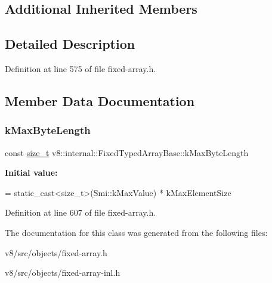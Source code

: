 \subsection*{Additional Inherited Members}


\subsection{Detailed Description}


Definition at line 575 of file fixed-\/array.\+h.



\subsection{Member Data Documentation}
\mbox{\label{classv8_1_1internal_1_1FixedTypedArrayBase_a911df330ee71dfde8f9affa302c710d0}} 
\subsubsection{\texorpdfstring{k\+Max\+Byte\+Length}{kMaxByteLength}}
{\footnotesize\ttfamily const \mbox{\hyperlink{classsize__t}{size\+\_\+t}} v8\+::internal\+::\+Fixed\+Typed\+Array\+Base\+::k\+Max\+Byte\+Length\hspace{0.3cm}{\ttfamily [static]}}

{\bfseries Initial value\+:}
\begin{DoxyCode}
=
      \textcolor{keyword}{static\_cast<}\textcolor{keywordtype}{size\_t}\textcolor{keyword}{>}(Smi::kMaxValue) * kMaxElementSize
\end{DoxyCode}


Definition at line 607 of file fixed-\/array.\+h.



The documentation for this class was generated from the following files\+:\begin{DoxyCompactItemize}
\item 
v8/src/objects/fixed-\/array.\+h\item 
v8/src/objects/fixed-\/array-\/inl.\+h\end{DoxyCompactItemize}
